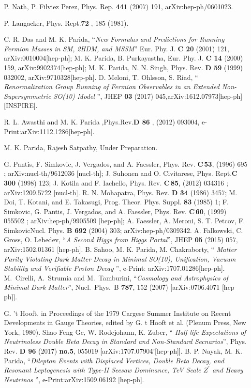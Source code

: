 \documentclass[a4paper,11pt]{article}
\begin{document}
\begin{thebibliography}{99}
  P. Nath, P. Filviez Perez, Phys. Rep. {\bf 441} (2007) 191, arXiv:hep-ph/0601023.
 
 P. Langacker, Phys. Rept.{\bf 72 }, 185 (1981).


C. R. Das and M. K. Parida, ``{\em New Formulas and
  Predictions for Running Fermion Masses in SM, 2HDM, and MSSM}'' Eur. Phy. J. {\bf C 20}
  (2001) 121, arXiv:0010004[hep-ph]; M. K. Parida, B. Purkayastha, Eur. Phy. J. {\bf C 14}
  (2000) 159, arXiv:9902374[hep-ph]; M. K. Parida, N. N. Singh,
  Phys. Rev. {\bf D 59} (1999) 032002, arXiv:9710328[hep-ph].
 D. Meloni, T. Ohlsson, S. Riad, ``{\em
  Renormalization Group Running of Fermion Observables in an Extended
  Non-Supersymmetric SO(10) Model }'', JHEP {\bf 03} (2017)
  045,arXiv:1612.07973[hep-ph] [{\small IN}SPIRE].
  
 R. L. Awasthi  and M. K. Parida ,Phys.Rev.{\bf D 86}
  , (2012)  093004, e-Print:arXiv:1112.1286[hep-ph].

 M. K. Parida, Rajesh Satpathy, Under Preparation.

 G. Pantis, F. Simkovic, J. Vergados, and A. Faessler, Phys. Rev. {\bf C\,53},  (1996) 695 ; 
arXiv:nucl-th/9612036 [nucl-th]; 
J. Suhonen and O. Civitarese, Phys. Rept.{\bf C 300} (1998) 123; 
J. Kotila and F. Iachello, Phys. Rev. {\bf C\,85},  (2012)  034316 ;
arXiv:1209.5722 [nucl-th].
R. N. Mohapatra, Phys. Rev. {\bf D 34 } (1986) 3457; M. Doi, T. Kotani, and E. Takasugi, Prog. Theor. Phys. Suppl. {\bf 83} (1985) 1;
F. Simkovic, G. Pantis, J. Vergados, and A. Faessler, Phys. Rev. {\bf C\,60},  (1999)  055502 ;
arXiv:hep-ph/9905509 [hep-ph]; A. Faessler, A. Meroni, S. T. Petcov, F. SimkovicNucl. Phys. {\bf B 692} (2004) 303; arXiv:hep-ph/0309342.  
 A. Falkowski, C. Gross, O. Lebedev, ``{\em A
  Second Higgs from Higgs Portal}'', JHEP {\bf 05} (2015) 057,
  arXiv:1502.01361 [hep-ph].
 B. Sahoo, M. K. Parida, M. Chakraborty, ``{\em
  Matter Parity Violating Dark Matter Decay in Minimal SO(10),
  Unification, Vacuum Stability and Verifiable Proton Decay }'',
  e-Print: arXiv:1707.01286[hep-ph].  
 M.~Cirelli, A.~Strumia and M.~Tamburini,
  ``{\em Cosmology and Astrophysics of Minimal Dark Matter}'',
  Nucl.\ Phys.\ B {\bf 787}, 152 (2007)
  [arXiv:0706.4071 [hep-ph]].

G. 't Hooft, in Proceedings of the 1979 Cargese Summer Institute on Recent Developments in Gauge Theories, edited by
 G. t Hooft et al. (Plenum Press, New York, 1980).
 Shao-Feng Ge, W. Rodejohann, K. Zuber, ``{\em
  Half-life Expectations of Neutrinoless Double Beta Decay in Standard
  and Non-Standard Secnarios}'', Phys. Rev. {\bf D 96} (2017) {\bf
  no.5}, 055019 [arXiv:1707.07904'[hep-ph]]. 
 B. P. Nayak, M. K. Parida, ``{\em Dilepton
  Events with Displaced Vertices, Double Beta Decay, and Resonant
  Leptogenesis with Type-II Seesaw Dominance, TeV Scale $Z^{\prime}$
  and Heavy Neutrinos }'', e-Print:arXiv:1509.06192 [hep-ph].  

\end{thebibliography}
\end{document}
